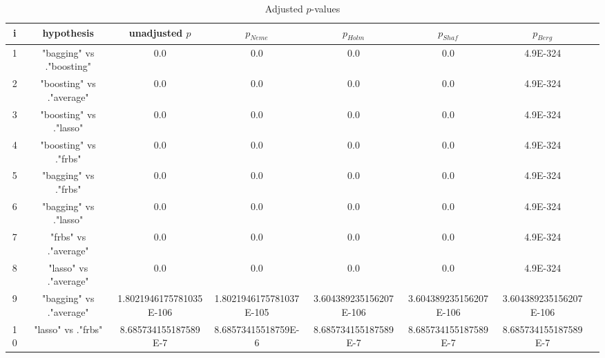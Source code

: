 \documentclass[a4paper,10pt]{article}
\begin{document}
\begin{landscape}
\begin{table}[!htp]
\centering\tiny
\caption{Adjusted $p$-values}
\begin{tabular}{cccccccc}
i&hypothesis&unadjusted $p$&$p_{Neme}$&$p_{Holm}$&$p_{Shaf}$&$p_{Berg}$\\
\hline
1&"bagging" vs ."boosting"&0.0&0.0&0.0&0.0&4.9E-324\\
2&"boosting" vs ."average"&0.0&0.0&0.0&0.0&4.9E-324\\
3&"boosting" vs ."lasso"&0.0&0.0&0.0&0.0&4.9E-324\\
4&"boosting" vs ."frbs"&0.0&0.0&0.0&0.0&4.9E-324\\
5&"bagging" vs ."frbs"&0.0&0.0&0.0&0.0&4.9E-324\\
6&"bagging" vs ."lasso"&0.0&0.0&0.0&0.0&4.9E-324\\
7&"frbs" vs ."average"&0.0&0.0&0.0&0.0&4.9E-324\\
8&"lasso" vs ."average"&0.0&0.0&0.0&0.0&4.9E-324\\
9&"bagging" vs ."average"&1.8021946175781035E-106&1.8021946175781037E-105&3.604389235156207E-106&3.604389235156207E-106&3.604389235156207E-106\\
10&"lasso" vs ."frbs"&8.685734155187589E-7&8.68573415518759E-6&8.685734155187589E-7&8.685734155187589E-7&8.685734155187589E-7\\
\hline
\end{tabular}
\end{table}

\end{landscape}
\end{document}
